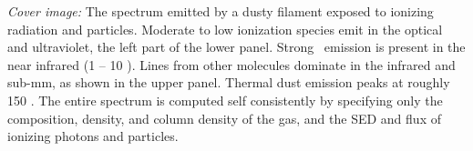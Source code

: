 \documentclass[12pt]{book}
\begin{document}
\clearpage

\vspace{5mm}
\noindent
{\small
{\em Cover image:} The spectrum emitted by a dusty filament exposed to 
ionizing radiation and particles.  
Moderate to low ionization species emit in the optical and
ultraviolet, the left part of the lower panel.
Strong \htwo\ emission is present in the near infrared (1 -- 10 \micron ).
Lines from other molecules dominate in the infrared and sub-mm, as shown in the upper panel.
Thermal dust emission peaks at roughly 150 \micron .  
The entire spectrum is computed self consistently by specifying only the composition, density,
and column density of the gas, and the SED and flux of ionizing photons and particles.
}
\clearpage

\setcounter{tocdepth}{2}
\tableofcontents
\listoffigures
\listoftables

\clearpage
\mainmatter
\appendix

\backmatter


\end{document}
